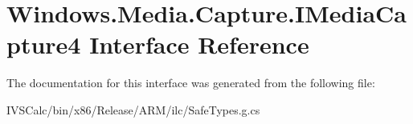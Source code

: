 \hypertarget{interface_windows_1_1_media_1_1_capture_1_1_i_media_capture4}{}\section{Windows.\+Media.\+Capture.\+I\+Media\+Capture4 Interface Reference}
\label{interface_windows_1_1_media_1_1_capture_1_1_i_media_capture4}


The documentation for this interface was generated from the following file\+:\begin{DoxyCompactItemize}
\item 
I\+V\+S\+Calc/bin/x86/\+Release/\+A\+R\+M/ilc/Safe\+Types.\+g.\+cs\end{DoxyCompactItemize}
